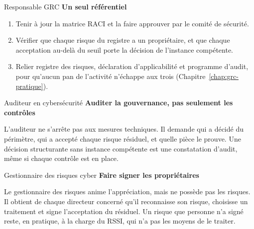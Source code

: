 \begin{boxmetier}{Responsable GRC}
\textbf{Un seul référentiel}
\begin{enumerate}
    \item Tenir à jour la matrice RACI et la faire approuver par le comité
          de sécurité.
    \item Vérifier que chaque risque du registre a un propriétaire, et que
          chaque acceptation au-delà du seuil porte la décision de
          l'instance compétente.
    \item Relier registre des risques, déclaration d'applicabilité et
          programme d'audit, pour qu'aucun pan de l'activité n'échappe aux
          trois (Chapitre~\ref{chap:grc-pratique}).
\end{enumerate}
\end{boxmetier}

\begin{boxmetier}{Auditeur en cybersécurité}
\textbf{Auditer la gouvernance, pas seulement les contrôles}

L'auditeur ne s'arrête pas aux mesures techniques. Il demande qui a décidé
du périmètre, qui a accepté chaque risque résiduel, et quelle pièce le
prouve. Une décision structurante sans instance compétente est une
constatation d'audit, même si chaque contrôle est en place.
\end{boxmetier}

\begin{boxmetier}{Gestionnaire des risques cyber}
\textbf{Faire signer les propriétaires}

Le gestionnaire des risques anime l'appréciation, mais ne possède pas les
risques. Il obtient de chaque directeur concerné qu'il reconnaisse son
risque, choisisse un traitement et signe l'acceptation du résiduel. Un
risque que personne n'a signé reste, en pratique, à la charge du RSSI, qui
n'a pas les moyens de le traiter.
\end{boxmetier}

\separateur

